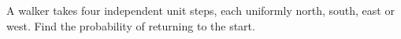 A walker takes four independent unit steps, each uniformly north, south, east or west. Find the probability of returning to the start.
